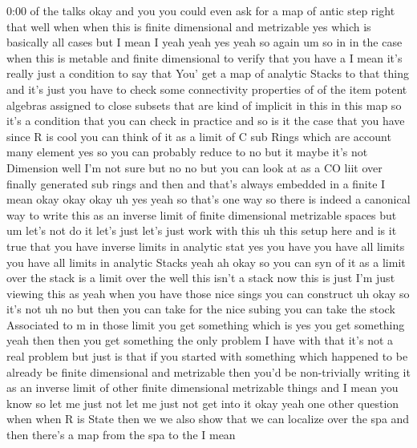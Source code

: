 \begin{unfinished}{0:00}
of  the  talks
okay  and  you  you  could  even  ask  for  a
map  of  antic  step  right  that  well  when
when  this  is  finite  dimensional  and
metrizable  yes  which  is  basically  all
cases  but  I  mean  I
yeah
yeah  yes
yeah  so  again  um  so  in  in  the  case  when
this  is  metable  and  finite
dimensional  to  verify  that  you  have  a  I
mean  it's  really  just  a  condition  to  say
that  You'  get  a  map  of  analytic  Stacks
to  that  thing  and  it's  just  you  have  to
check  some  connectivity  properties  of  of
the  item  potent  algebras  assigned  to
close  subsets  that  are  kind  of  implicit
in  this  in  this  map  so  it's  a  condition
that  you  can  check  in  practice  and  so  is
it  the  case  that  you
have  since  R  is  cool  you  can  think  of  it
as  a  limit  of  C
sub  Rings  which  are  account  many  element
yes  so  you  can  probably  reduce
to  no  but  it  maybe  it's  not  Dimension
well  I'm  not  sure  but  no  no  but  you  can
look  at  as  a  CO  liit  over  finally
generated  sub  rings  and  then  and  that's
always  embedded  in  a  finite  I  mean  okay
okay
okay  uh  yes  yeah  so  that's  one  way  so
there  is  indeed  a  canonical  way  to  write
this  as  an  inverse  limit  of  finite
dimensional  metrizable  spaces  but  um
let's  not  do  it  let's  just  let's  just
work  with  this  uh  this  setup  here  and  is
it  true  that  you  have  inverse  limits  in
analytic  stat  yes  you  have  you  have  all
limits  you  have  all  limits  in  analytic
Stacks  yeah  ah  okay  so  you  can  syn  of  it
as  a  limit  over  the  stack  is  a  limit
over  the  well  this  isn't  a  stack  now
this  is  just  I'm  just  viewing  this  as
yeah  when  you  have  those  nice  sings  you
can
construct
uh  okay  so  it's  not
uh  no  but  then  you  can  take  for  the  nice
subing  you  can  take  the  stock  Associated
to  m  in  those  limit  you  get  something
which  is  yes  you  get  something  yeah  then
then  you  get  something  the  only  problem
I  have  with  that  it's  not  a  real  problem
but  just  is  that  if  you  started  with
something  which  happened  to  be  already
be  finite  dimensional  and  metrizable
then  you'd  be  non-trivially  writing  it
as  an  inverse  limit  of  other  finite
dimensional  metrizable  things  and  I  mean
you  know  so  let  me  just  not  let  me  just
not  get  into  it
okay  yeah  one  other  question  when  when  R
is  State  then  we  we  also  show  that  we
can  localize  over  the  spa  and  then
there's  a  map  from  the  spa  to  the  I  mean

\end{unfinished}
